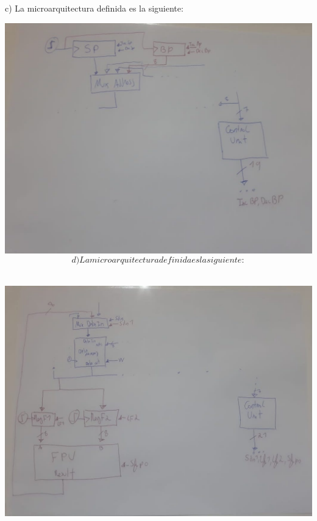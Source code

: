 \documentclass[letter]{article}
\begin{document}
$$ $$

c) La microarquitectura definida es la siguiente:

$$ $$
{\includegraphics[width=15cm]{p3.jpeg}}
$$

d) La microarquitectura definida es la siguiente:

$$ $$

{\includegraphics[width=15cm]{p4.jpeg}}
\end{document}

